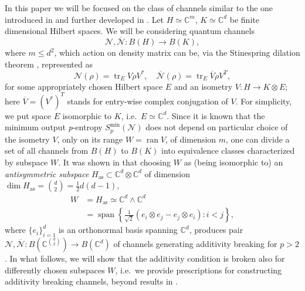 \documentclass[reqno]{amsart}
\theoremstyle{plain}
\theoremstyle{note}
\newcommand{\aspace}{H_{\mathrm{as}}}
\newcommand{\complexes}{\mathbb{C}}
\newcommand{\ran}[1]{\operatorname{ran}{#1}}
\newcommand{\ptr}[2]{\operatorname{tr}_{#1}{#2}}
\newcommand{\Span}{\operatorname{span}}
\begin{document}
In this paper we will be focused on the class of channels similar to the one introduced in \cite{Hayden2008,Hastings2009} and further developed in \cite{Grudka_2010}. Let $H \simeq \complexes^m$, $K\simeq \complexes^d$ be finite dimensional Hilbert spaces. We will be considering quantum channels
\begin{equation}
    \mathcal{N}, \overline{\mathcal{N}} : B(H) \to B(K),
\end{equation}
where $m\leqslant d^2$, which action on density matrix can be, via the Stinespring dilation theorem \cite{Stinespring}, represented as
\begin{equation}\label{eq:StinespringNNbar}
    \mathcal{N}(\rho) = \ptr{E}{V\rho V^*}, \quad \overline{\mathcal{N}}(\rho) = \ptr{E}{\overline{V}\rho V^T},
\end{equation}
for some appropriately chosen Hilbert space $E$ and an isometry $V : H \to K \otimes E$; here $\overline{V} = (V^*)^T$ stands for entry-wise complex conjugation of $V$. For simplicity, we put space $E$ isomorphic to $K$, i.e.~$E \simeq \complexes^d$. Since it is known \cite{Aubrun2011} that the minimum output \textit{p}-entropy $S_{p}^{\mathrm{min}}(\mathcal{N})$ does not depend on particular choice of the isometry $V$, only on its range $W = \ran{V}$, of dimension $m$, one can divide a set of all channels from $B(H)$ to $B(K)$ into equivalence classes characterized by subspace $W$. It was shown in \cite{Grudka_2010} that choosing $W$ as (being isomorphic to) an \emph{antisymmetric subspace} $\aspace \subset \complexes^d \otimes \complexes^d$ of dimension $\dim{\aspace} = \binom{d}{2} = \frac{1}{2}d(d-1)$,
 \begin{align}
     W &= \aspace \simeq \complexes^d \wedge \complexes^d \\
     &= \Span{\left\{\frac{1}{\sqrt{2}}(e_i \otimes e_j - e_j \otimes e_i) : i < j\right\}},\nonumber
 \end{align}
where $\{e_i\}_{i=1}^{d}$ is an orthonormal basis spanning $\complexes^d$, produces pair $\mathcal{N},\overline{\mathcal{N}} : B(\complexes^{\binom{d}{2}})\to B(\complexes^d)$ of channels generating additivity breaking for $p>2$. In what follows, we will show that the additivity condition is broken also for differently chosen subspaces $W$, i.e.~we provide prescriptions for constructing additivity breaking channels, beyond results in \cite{Grudka_2010}.
 
\end{document}
